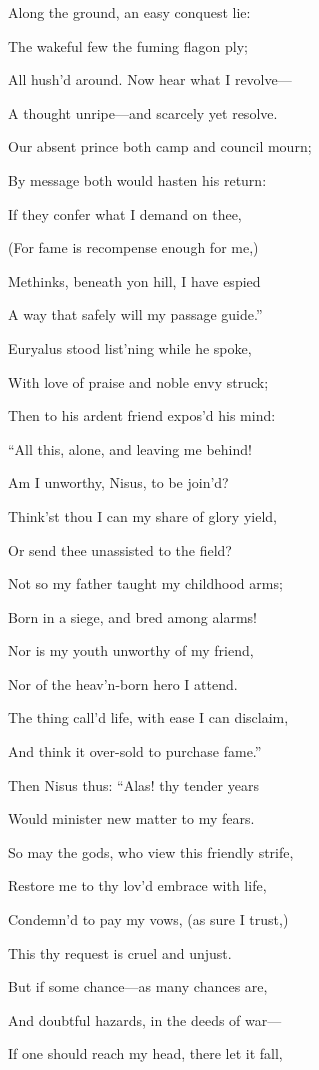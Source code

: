 Along the ground, an easy conquest lie:

The wakeful few the fuming flagon ply;

All hush’d around. Now hear what I revolve—

A thought unripe—and scarcely yet resolve.

Our absent prince both camp and council mourn;

By message both would hasten his return:

If they confer what I demand on thee,

(For fame is recompense enough for me,)

Methinks, beneath yon hill, I have espied

A way that safely will my passage guide.”

Euryalus stood list’ning while he spoke,

With love of praise and noble envy struck;

Then to his ardent friend expos’d his mind:

“All this, alone, and leaving me behind!

Am I unworthy, Nisus, to be join’d?

Think’st thou I can my share of glory yield,

Or send thee unassisted to the field?

Not so my father taught my childhood arms;

Born in a siege, and bred among alarms!

Nor is my youth unworthy of my friend,

Nor of the heav’n-born hero I attend.

The thing call’d life, with ease I can disclaim,

And think it over-sold to purchase fame.”

Then Nisus thus: “Alas! thy tender years

Would minister new matter to my fears.

So may the gods, who view this friendly strife,

Restore me to thy lov’d embrace with life,

Condemn’d to pay my vows, (as sure I trust,)

This thy request is cruel and unjust.

But if some chance—as many chances are,

And doubtful hazards, in the deeds of war—

If one should reach my head, there let it fall,

